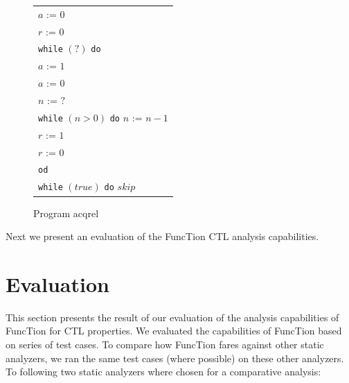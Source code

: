 \documentclass[11pt,a4paper,titlepage]{article}
\theoremstyle{definition}
\begin{document}
\begin{figure}
    \begin{center}
        \begin{tabular}{l}
            $a$ := $0$ \\
            $r$ := $0$ \\
            \texttt{while} $(?)$ \texttt{do} \\
            \hspace{1em}$a$ := $1$ \\
            \hspace{1em}$a$ := $0$ \\
            \hspace{1em}$n$ := $?$ \\
            \hspace{1em}\texttt{while} $(n > 0)$ \texttt{do} $n$ := $n - 1$ \\
            \hspace{1em}$r$ := $1$ \\
            \hspace{1em}$r$ := $0$ \\
            \texttt{od}\\
            \texttt{while} $(true)$ \texttt{do} $skip$ \\
        \end{tabular}
    \end{center}
    \vspace{-1em}
    \caption{Program \textsf{acqrel}}
    \label{fig:acqrel}
\end{figure}

Next we present an evaluation of the FuncTion CTL analysis capabilities. 

\section{Evaluation}\label{sec:evaluation}

This section presents the result of our evaluation of the analysis capabilities of FuncTion for CTL properties. 
We evaluated the capabilities of FuncTion based on series of test cases. To compare how FuncTion fares against other
static analyzers, we ran the same test cases (where possible) on these other analyzers. 
To following two static analyzers where chosen for a comparative analysis:\\
\end{document}
